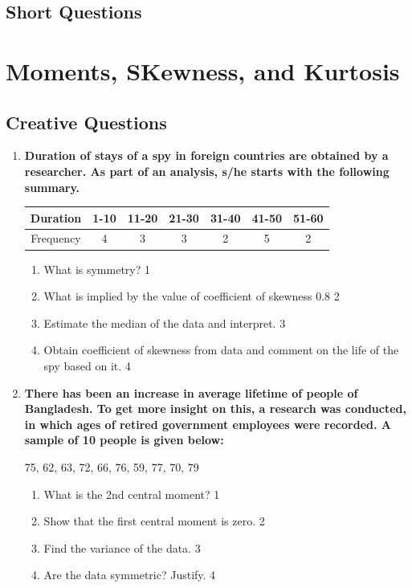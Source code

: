 \documentclass[a4paper,oneside]{book}
\begin{document}
\section{Short Questions}

\chapter{Moments, SKewness, and Kurtosis} 
\section{Creative Questions}

  \begin{enumerate}

   \item
	  \textbf{Duration of stays of a spy in foreign countries are obtained by a researcher. As part of an analysis, s/he starts with the following summary.} 
	  
	  \begin{table}[h]
	  \centering
\begin{tabular}{c|cccccc}
Duration & 1-10 & 11-20 & 21-30 & 31-40 & 41-50 & 51-60 \\ \hline
Frequency & 4 & 3 & 3 & 2 & 5 & 2
\end{tabular}
\end{table}
  
  \begin{enumerate}
    \item
	What is symmetry? \hfill 1
    \item
	What is implied by the value of coefficient of skewness 0.8 \hfill 2
    \item  
	Estimate the median of the data and interpret. \hfill 3
    \item
	Obtain coefficient of skewness from data and comment on the life of the spy based on it. \hfill 4
  \end{enumerate}


   \item
	  \textbf{There has been an increase in average lifetime of people of Bangladesh. To get more insight on this, a research was conducted, in which ages of retired government employees were recorded. A sample of 10 people is given below:}
	  
	  \begin{center}
	  75, 62, 63, 72, 66, 76, 59, 77, 70, 79
	  \end{center}
    \begin{enumerate}
    \item
	What is the 2nd central moment? \hfill 1
    \item
	Show that the first central moment is zero. \hfill 2
    \item  
	Find the variance of the data. \hfill 3
    \item
	Are the data symmetric? Justify. \hfill 4
  \end{enumerate}
  

\end{enumerate}
\end{document}
